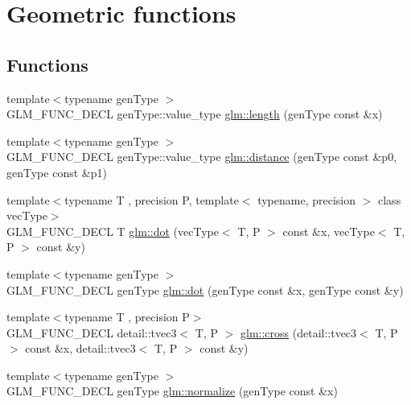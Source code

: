 \hypertarget{group__core__func__geometric}{\section{Geometric functions}
\label{group__core__func__geometric}
}
\subsection*{Functions}
\begin{DoxyCompactItemize}
\item 
{\footnotesize template$<$typename gen\-Type $>$ }\\G\-L\-M\-\_\-\-F\-U\-N\-C\-\_\-\-D\-E\-C\-L gen\-Type\-::value\-\_\-type \hyperlink{group__core__func__geometric_ga03b2831439defb8922832b540b91b8a7}{glm\-::length} (gen\-Type const \&x)
\item 
{\footnotesize template$<$typename gen\-Type $>$ }\\G\-L\-M\-\_\-\-F\-U\-N\-C\-\_\-\-D\-E\-C\-L gen\-Type\-::value\-\_\-type \hyperlink{group__core__func__geometric_ga00716eae37e8ae2a76ca7799f9c75682}{glm\-::distance} (gen\-Type const \&p0, gen\-Type const \&p1)
\item 
{\footnotesize template$<$typename T , precision P, template$<$ typename, precision $>$ class vec\-Type$>$ }\\G\-L\-M\-\_\-\-F\-U\-N\-C\-\_\-\-D\-E\-C\-L T \hyperlink{group__core__func__geometric_ga7dada304da2ba7dd3376ab4f178c3f6b}{glm\-::dot} (vec\-Type$<$ T, P $>$ const \&x, vec\-Type$<$ T, P $>$ const \&y)
\item 
{\footnotesize template$<$typename gen\-Type $>$ }\\G\-L\-M\-\_\-\-F\-U\-N\-C\-\_\-\-D\-E\-C\-L gen\-Type \hyperlink{group__core__func__geometric_gaef767c2b0678489cb9de7a534137a86d}{glm\-::dot} (gen\-Type const \&x, gen\-Type const \&y)
\item 
{\footnotesize template$<$typename T , precision P$>$ }\\G\-L\-M\-\_\-\-F\-U\-N\-C\-\_\-\-D\-E\-C\-L detail\-::tvec3$<$ T, P $>$ \hyperlink{group__core__func__geometric_ga89b91c2a256cfb62ecbc589d1ee36d3c}{glm\-::cross} (detail\-::tvec3$<$ T, P $>$ const \&x, detail\-::tvec3$<$ T, P $>$ const \&y)
\item 
{\footnotesize template$<$typename gen\-Type $>$ }\\G\-L\-M\-\_\-\-F\-U\-N\-C\-\_\-\-D\-E\-C\-L gen\-Type \hyperlink{group__core__func__geometric_ga15aa87101457e41663b08a8dcc3357f8}{glm\-::normalize} (gen\-Type const \&x)

\end{DoxyCompactItemize}
